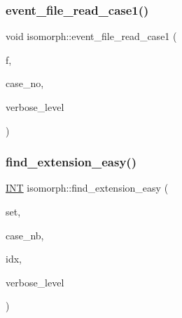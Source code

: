 \subsubsection{\texorpdfstring{event\+\_\+file\+\_\+read\+\_\+case1()}{event\_file\_read\_case1()}}
{\footnotesize\ttfamily void isomorph\+::event\+\_\+file\+\_\+read\+\_\+case1 (\begin{DoxyParamCaption}\item[{ifstream \&}]{f,  }\item[{\mbox{\hyperlink{galois_8h_a09fddde158a3a20bd2dcadb609de11dc}{I\+NT}}}]{case\+\_\+no,  }\item[{\mbox{\hyperlink{galois_8h_a09fddde158a3a20bd2dcadb609de11dc}{I\+NT}}}]{verbose\+\_\+level }\end{DoxyParamCaption})}

\mbox{\label{classisomorph_a2861ed73bff2090e2c2a97e263258134}} 
\subsubsection{\texorpdfstring{find\+\_\+extension\+\_\+easy()}{find\_extension\_easy()}}
{\footnotesize\ttfamily \mbox{\hyperlink{galois_8h_a09fddde158a3a20bd2dcadb609de11dc}{I\+NT}} isomorph\+::find\+\_\+extension\+\_\+easy (\begin{DoxyParamCaption}\item[{\mbox{\hyperlink{galois_8h_a09fddde158a3a20bd2dcadb609de11dc}{I\+NT}} $\ast$}]{set,  }\item[{\mbox{\hyperlink{galois_8h_a09fddde158a3a20bd2dcadb609de11dc}{I\+NT}}}]{case\+\_\+nb,  }\item[{\mbox{\hyperlink{galois_8h_a09fddde158a3a20bd2dcadb609de11dc}{I\+NT}} \&}]{idx,  }\item[{\mbox{\hyperlink{galois_8h_a09fddde158a3a20bd2dcadb609de11dc}{I\+NT}}}]{verbose\+\_\+level }\end{DoxyParamCaption})}

\mbox{\label{classisomorph_a239dde6a8264198fc3f6fb2e15cd882d}} 
